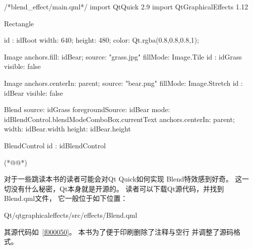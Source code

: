\label{f000052}    %
\FloatBarrier                                  %
\begin{thebookfilesourceone}[escapeinside={(*@}{@*)},
caption=GoodLuck,
title=\filesourcenumbernameone \thefilesourcenumber
]
/*blend_effect/main.qml*/
import QtQuick 2.9
import QtGraphicalEffects 1.12

Rectangle {
    id : idRoot
    width: 640;
    height: 480;
    color: Qt.rgba(0.8,0.8,0.8,1);

    Image{
        anchors.fill: idBear;
        source: "grass.jpg"
        fillMode: Image.Tile
        id : idGrass
        visible: false
    }

    Image{
        anchors.centerIn: parent;
        source: "bear.png"
        fillMode: Image.Stretch
        id : idBear
        visible: false
    }

    Blend{
        source: idGrass
        foregroundSource: idBear
        mode: idBlendControl.blendModeComboBox.currentText
        anchors.centerIn: parent;
        width: idBear.width
        height: idBear.height
    }

    BlendControl {
        id : idBlendControl
    }

}(*@\marginpar[\hfill\setlength\fboxsep{2pt}\fbox{\footnotesize{\kaishu\parbox{1em}{\setlength{\baselineskip}{2pt}\filesourcenumbernameone}}\footnotesize{\thefilesourcenumber}}]{\setlength\fboxsep{2pt}\fbox{\footnotesize{\kaishu\parbox{1em}{\setlength{\baselineskip}{2pt}\filesourcenumbernameone}}\footnotesize{\thefilesourcenumber}}}@*)\end{thebookfilesourceone}          %
\addtocounter{lstlisting}{-1}   %


对于一些跳读本书的读者可能会对Qt Quick如何实现
Blend特效感到好奇。
这一切没有什么秘密，Qt本身就是开源的。
读者可以下载Qt源代码，并找到Blend.qml文件，
它一般位于如下位置：\begin{littlelongworld}
Qt/qtgraphicaleffects/src/effects/Blend.qml
\end{littlelongworld}

其源代码如\filesourcenumbernameone\ \ref{f000050}。
本书为了便于印刷删除了注释与空行
并调整了源码格式。

